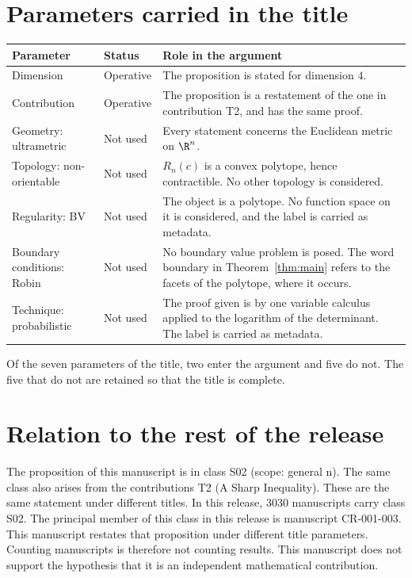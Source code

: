 \documentclass[11pt]{article}
\begin{document}
\section{Parameters carried in the title}\label{sec:params}
\begin{center}
\small
\begin{tabular}{p{}p{}p{}}
\toprule
Parameter & Status & Role in the argument \\
\midrule
Dimension & Operative & The proposition is stated for dimension $4$. \\
Contribution & Operative & The proposition is a restatement of the one in contribution T2, and has the same proof. \\
Geometry: ultrametric & Not used & Every statement concerns the Euclidean metric on $\R^n$. \\
Topology: non-orientable & Not used & $R_n(c)$ is a convex polytope, hence contractible. No other topology is considered. \\
Regularity: BV & Not used & The object is a polytope. No function space on it is considered, and the label is carried as metadata. \\
Boundary conditions: Robin & Not used & No boundary value problem is posed. The word boundary in Theorem~\ref{thm:main} refers to the facets of the polytope, where it occurs. \\
Technique: probabilistic & Not used & The proof given is by one variable calculus applied to the logarithm of the determinant. The label is carried as metadata. \\
\bottomrule
\end{tabular}
\end{center}
Of the seven parameters of the title, two enter the argument and five do not. The five that do not are retained so that the title is complete.

\section{Relation to the rest of the release}
The proposition of this manuscript is in class S02 (scope: general n). The same class also arises from the contributions T2 (A Sharp Inequality). These are the same statement under different titles.
In this release, 3030 manuscripts carry class S02. The principal member of this class in this release is manuscript CR-001-003. This manuscript restates that proposition under different title parameters.
Counting manuscripts is therefore not counting results. This manuscript does not support the hypothesis that it is an independent mathematical contribution.
\end{document}
